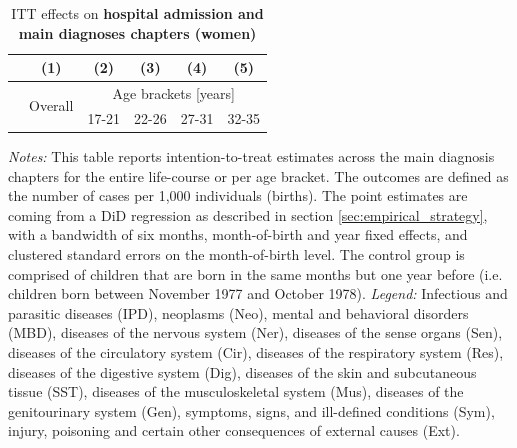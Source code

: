 \documentclass[11pt, a4paper, draft]{article} %
\begin{document}
\newpage
{} 
\vspace*{\fill}
\begin{table}[H] \centering 
	\begin{threeparttable} \centering \caption{ITT effects on \textbf{hospital admission and main diagnoses chapters (women)}}\label{tab: ITT_across_chapters_per_age_group_women}
		{\def\sym#1{\ifmmode^{#1}\else\(^{#1}\)\fi} 
			\begin{tabular}{l*{5}{c}}
				\toprule 
				&\multicolumn{1}{c}{(1)}&\multicolumn{1}{c}{(2)}&\multicolumn{1}{c}{(3)}&\multicolumn{1}{c}{(4)}&\multicolumn{1}{c}{(5)}\\
				\midrule
				&\multirow{2}{*}{Overall} & \multicolumn{4}{c}{Age brackets [years]} \\ 
				\cmidrule(lr){3-6}
				&&\multicolumn{1}{c}{17-21}&\multicolumn{1}{c}{22-26}&\multicolumn{1}{c}{27-31}&\multicolumn{1}{c}{32-35}\\
				
				\midrule
				
				
				
				\bottomrule 
		\end{tabular}}
	\end{threeparttable} 
	\begin{minipage}{0.9\linewidth}
		\scriptsize \emph{Notes:} This table reports intention-to-treat estimates across the main diagnosis chapters for the entire life-course or per age bracket. The outcomes are defined as the number of cases per 1,000 individuals (births). The point estimates are coming from a DiD regression as described in section \ref{sec:empirical_strategy}, with a bandwidth of six months, month-of-birth and year fixed effects, and clustered standard errors on the month-of-birth level. The control group is comprised of children that are born in the same months but one year before (i.e. children born between November 1977 and October 1978).\newline
		\emph{Legend:} Infectious and parasitic diseases (IPD), neoplasms (Neo), mental and behavioral disorders (MBD), diseases of the nervous system (Ner), diseases of the sense organs (Sen), diseases of the circulatory system (Cir), diseases of the respiratory system (Res), diseases of the digestive system (Dig), diseases of the skin and subcutaneous tissue (SST), diseases of the musculoskeletal system (Mus), diseases of the genitourinary system (Gen), symptoms, signs, and ill-defined conditions (Sym), injury, poisoning and certain other consequences of external causes (Ext).
	\end{minipage}
\end{table} 
\vspace*{\fill}\clearpage 
\restoregeometry
\end{document}
